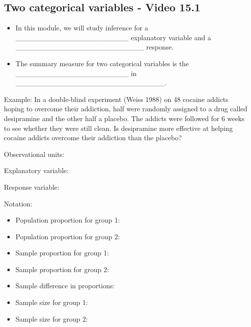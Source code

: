 \documentclass[
]{report}
\begin{document}
\newpage

\subsection*{Two categorical variables - Video 15.1}\label{two-categorical-variables---video-15.1}


\begin{itemize}
\item
  In this module, we will study inference for a \_\_\_\_\_\_\_\_\_\_\_\_\_\_\_\_\_\_\_\_\_\_ explanatory variable and a \_\_\_\_\_\_\_\_\_\_\_\_\_\_\_\_\_\_\_\_\_\_\_\_\_ response.
\item
  The summary measure for two categorical variables is the \_\_\_\_\_\_\_\_\_\_\_\_\_\_\_\_\_\_\_\_\_\_ in \_\_\_\_\_\_\_\_\_\_\_\_\_\_\_\_\_\_\_\_\_\_\_\_\_\_\_\_\_.
\end{itemize}


Example: In a double-blind experiment (Weiss 1988) on 48 cocaine addicts hoping to overcome their addiction, half were randomly assigned to a drug called desipramine and the other half a placebo. The addicts were followed for 6 weeks to see whether they were still clean. Is desipramine more effective at helping cocaine addicts overcome their addiction than the placebo?

Observational units:

\vspace{0.15in}

Explanatory variable:

\vspace{0.15in}

Response variable:

\vspace{0.15in}


Notation:

\begin{itemize}
\item
  Population proportion for group 1:
\item
  Population proportion for group 2:
\item
  Sample proportion for group 1:
\item
  Sample proportion for group 2:
\item
  Sample difference in proportions:
\item
  Sample size for group 1:
\item
  Sample size for group 2:
\end{itemize}
\end{document}
